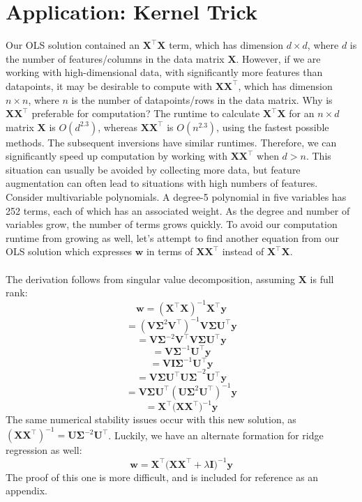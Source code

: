 \documentclass{article}
\begin{document}
\section*{Application: Kernel Trick}
Our OLS solution contained an $\mathbf{X^{\top}X}$ term, which has dimension $d \times d$, where $d$ is the number of features/columns in the data matrix $\mathbf{X}$. However, if we are working with high-dimensional data, with significantly more features than datapoints, it may be desirable to compute with $\mathbf{XX^{\top}}$, which has dimension $n \times n$, where $n$ is the number of datapoints/rows in the data matrix. Why is $\mathbf{XX^{\top}}$ preferable for computation? The runtime to calculate $\mathbf{X^{\top}X}$ for an $n \times d$ matrix $\mathbf{X}$ is $O(d^{2.3})$, whereas $\mathbf{XX^{\top}}$ is $O(n^{2.3})$, using the fastest possible methods. The subsequent inversions have similar runtimes. Therefore, we can significantly speed up computation by working with $\mathbf{XX^{\top}}$ when $d > n$. This situation can usually be avoided by collecting more data, but feature augmentation can often lead to situations with high numbers of features. Consider multivariable polynomials. A degree-5 polynomial in five variables has 252 terms, each of which has an associated weight. As the degree and number of variables grow, the number of terms grows quickly. To avoid our computation runtime from growing as well, let's attempt to find another equation from our OLS solution which expresses $\mathbf{w}$ in terms of $\mathbf{XX^{\top}}$ instead of $\mathbf{X^{\top}X}$.\\\\
The derivation follows from singular value decomposition, assuming $\mathbf{X}$ is full rank: $$\mathbf{w} = (\mathbf{X^{\top}X})^{-1}\mathbf{X^{\top}y}$$ $$=(\mathbf{V\Sigma}^2\mathbf{ V^{\top}})^{-1}\mathbf{V\Sigma U^{\top}y}$$ $$=\mathbf{V\Sigma}^{-2}\mathbf{V^{\top}V\Sigma U^{\top}y}$$ $$=\mathbf{V\Sigma}^{-1}\mathbf{U^{\top}y}$$ $$=\mathbf{VI\Sigma}^{-1}\mathbf{U^{\top}y}$$ $$= \mathbf{V\Sigma U^{\top}U\Sigma}^{-2}\mathbf{U^{\top}y}$$ $$=\mathbf{V\Sigma U^{\top}}(\mathbf{U\Sigma}^2\mathbf{U^{\top}})^{-1}\mathbf{y}$$ $$= \mathbf{X^{\top}(XX^{\top}})^{-1}\mathbf{y}$$
The same numerical stability issues occur with this new solution, as $(\mathbf{XX^{\top}})^{-1} = \mathbf{U\Sigma}^{-2}\mathbf{U^{\top}}$. Luckily, we have an alternate formation for ridge regression as well: $$\mathbf{w} = \mathbf{X^{\top}(XX^{\top}} + \lambda\mathbf{I})^{-1}\mathbf{y}$$ The proof of this one is more difficult, and is included for reference as an appendix.\\\\
\end{document}
